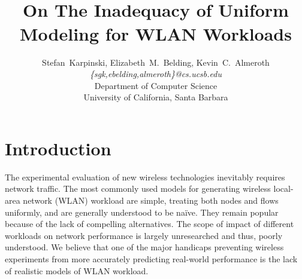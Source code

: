 \documentclass[conference]{IEEEtran}
\title{
\thetitle\\
\vspace{0.2em}
\LARGE{On The Inadequacy of Uniform Modeling for WLAN Workloads}
}
\author{
{\large{Stefan~Karpinski, Elizabeth~M.~Belding, Kevin~C.~Almeroth}}\\
\textit{\{sgk,ebelding,almeroth\}@cs.ucsb.edu}\vspace{0.5em}\\
Department of Computer Science\\
University of California, Santa Barbara
\vspace{-0.5em}
}
\newcommand{\caps}[1]{{\small{#1}}}
\begin{document}
\maketitle

\begin{abstract}

\end{abstract}

\vspace{1em}
\section{Introduction}\label{sec:intro}

The experimental evaluation of new wireless technologies inevitably requires network traffic. The most commonly used models for generating wireless local-area network (\caps{WLAN}) workload are simple, treating both nodes and flows uniformly, and are generally understood to be na\"ive. They remain popular because of the lack of compelling alternatives. The scope of impact of different workloads on network performance is largely unresearched and thus, poorly understood. We believe that one of the major handicaps preventing wireless experiments from more accurately predicting real-world performance is the lack of realistic models of \caps{WLAN} workload.

\end{document}
